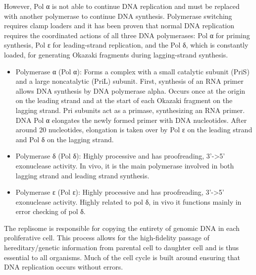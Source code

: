 However, Pol α is not able to continue DNA replication and must be replaced with another polymerase to continue DNA synthesis. Polymerase switching requires clamp loaders and it has been proven that normal DNA replication requires the coordinated actions of all three DNA polymerases: Pol α for priming synthesis, Pol ε for leading-strand replication, and the Pol δ, which is constantly loaded, for generating Okazaki fragments during lagging-strand synthesis.

\begin{itemize}
\tightlist
\item
  Polymerase α (Pol α): Forms a complex with a small catalytic subunit (PriS) and a large noncatalytic (PriL) subunit. First, synthesis of an RNA primer allows DNA synthesis by DNA polymerase alpha. Occurs once at the origin on the leading strand and at the start of each Okazaki fragment on the lagging strand. Pri subunits act as a primase, synthesizing an RNA primer. DNA Pol α elongates the newly formed primer with DNA nucleotides. After around 20 nucleotides, elongation is taken over by Pol ε on the leading strand and Pol δ on the lagging strand.
\item
  Polymerase δ (Pol δ): Highly processive and has proofreading, 3'-\textgreater{}5' exonuclease activity. In vivo, it is the main polymerase involved in both lagging strand and leading strand synthesis.
\item
  Polymerase ε (Pol ε): Highly processive and has proofreading, 3'-\textgreater{}5' exonuclease activity. Highly related to pol δ, in vivo it functions mainly in error checking of pol δ.
\end{itemize}

The replisome is responsible for copying the entirety of genomic DNA in each proliferative cell. This process allows for the high-fidelity passage of hereditary/genetic information from parental cell to daughter cell and is thus essential to all organisms. Much of the cell cycle is built around ensuring that DNA replication occurs without errors.



